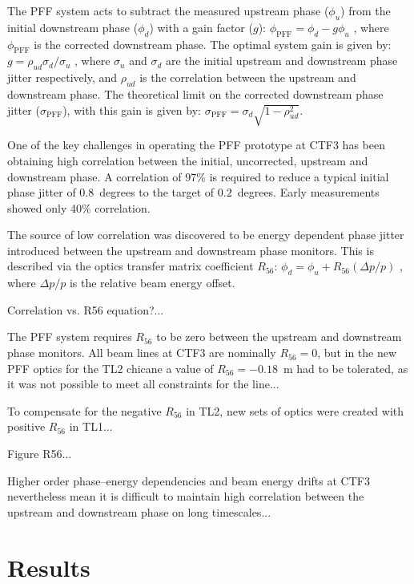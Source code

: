 \documentclass[%
 reprint,
 amsmath,amssymb,
 aps,
]{revtex4-1}
\begin{document}
The PFF system acts to subtract the measured upstream phase (\(\phi_u\)) from 
the initial downstream phase (\(\phi_d\)) with a gain factor (\(g\)):
\(\phi_{\mathrm{PFF}} = \phi_d - g\phi_u\)
, where \(\phi_{\mathrm{PFF}}\) is the corrected downstream phase. The optimal 
system gain is given by:
\(g = \rho_{ud} \sigma_d/\sigma_u\)
, where \(\sigma_u\) and \(\sigma_d\) are the initial upstream and downstream 
phase jitter respectively, and \(\rho_{ud}\) is the correlation between the 
upstream and downstream phase. The theoretical limit on the corrected 
downstream phase jitter (\(\sigma_{\mathrm{PFF}}\)), with this gain is given by:
\(\sigma_{\mathrm{PFF}}=\sigma_d \sqrt{1-\rho_{ud}^2}\). 

One of the key challenges in operating the PFF prototype at CTF3 has been 
obtaining high correlation between the initial, uncorrected, upstream and 
downstream phase. A correlation of 97\% is required to reduce a typical initial 
phase jitter of \(0.8\)~degrees to the target of \(0.2\)~degrees. Early 
measurements showed only 40\% correlation.

The source of low correlation was discovered to be energy dependent phase 
jitter introduced between the upstream and downstream phase monitors. This is 
described via the optics transfer matrix coefficient \(R_{56}\):
\(\phi_d = \phi_u + R_{56}(\Delta p / p)\)
, where \(\Delta p / p\) is the relative beam energy offset.

Correlation vs. R56 equation?...

The PFF system requires \(R_{56}\) to be zero between the upstream and 
downstream phase monitors. All beam lines at CTF3 are nominally \(R_{56}=0\), 
but in the new PFF optics for the TL2 chicane a value of \(R_{56}=-0.18\)~m had 
to be tolerated, as it was not possible to meet all constraints for the line...

To compensate for the negative \(R_{56}\) in TL2, new sets of optics were 
created with positive \(R_{56}\) in TL1...

Figure R56...

Higher order phase--energy dependencies and beam energy drifts at CTF3 
nevertheless mean it is difficult to maintain high correlation between the 
upstream and downstream phase on long timescales...

\section{\label{s:results}Results}
\end{document}
